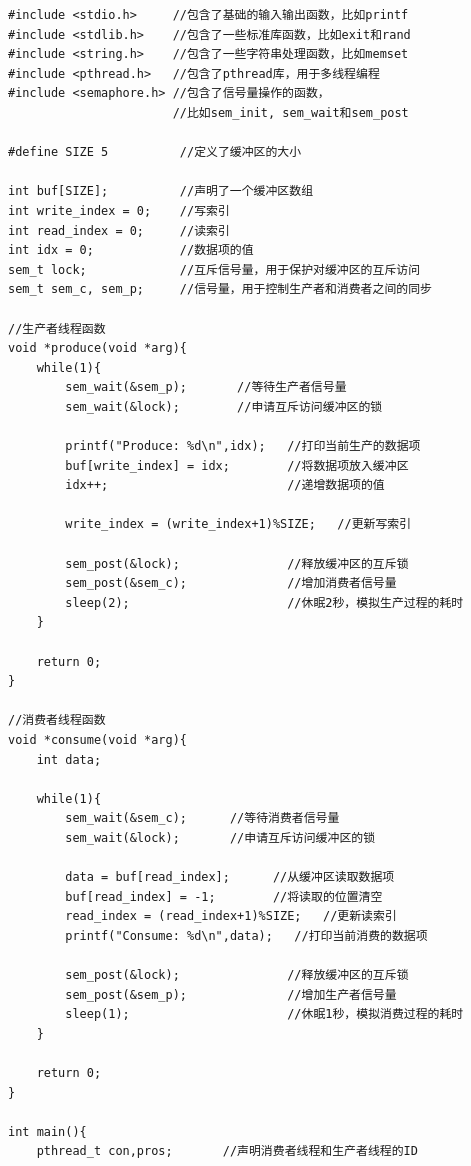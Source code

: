 \documentclass[12pt, a4paper, oneside]{ctexbook}
\numberwithin{figure}{section}
\begin{document}
\begin{verbatim}
#include <stdio.h>     //包含了基础的输入输出函数，比如printf
#include <stdlib.h>    //包含了一些标准库函数，比如exit和rand
#include <string.h>    //包含了一些字符串处理函数，比如memset
#include <pthread.h>   //包含了pthread库，用于多线程编程
#include <semaphore.h> //包含了信号量操作的函数，
                       //比如sem_init, sem_wait和sem_post

#define SIZE 5          //定义了缓冲区的大小

int buf[SIZE];          //声明了一个缓冲区数组
int write_index = 0;    //写索引
int read_index = 0;     //读索引
int idx = 0;            //数据项的值
sem_t lock;             //互斥信号量，用于保护对缓冲区的互斥访问
sem_t sem_c, sem_p;     //信号量，用于控制生产者和消费者之间的同步

//生产者线程函数
void *produce(void *arg){
    while(1){
        sem_wait(&sem_p);       //等待生产者信号量
        sem_wait(&lock);        //申请互斥访问缓冲区的锁
        
        printf("Produce: %d\n",idx);   //打印当前生产的数据项
        buf[write_index] = idx;        //将数据项放入缓冲区
        idx++;                         //递增数据项的值
        
        write_index = (write_index+1)%SIZE;   //更新写索引

        sem_post(&lock);               //释放缓冲区的互斥锁
        sem_post(&sem_c);              //增加消费者信号量       
        sleep(2);                      //休眠2秒，模拟生产过程的耗时
    }    
   
    return 0;
}

//消费者线程函数
void *consume(void *arg){
    int data;

    while(1){
        sem_wait(&sem_c);      //等待消费者信号量
        sem_wait(&lock);       //申请互斥访问缓冲区的锁
        
        data = buf[read_index];      //从缓冲区读取数据项
        buf[read_index] = -1;        //将读取的位置清空
        read_index = (read_index+1)%SIZE;   //更新读索引
        printf("Consume: %d\n",data);   //打印当前消费的数据项

        sem_post(&lock);               //释放缓冲区的互斥锁
        sem_post(&sem_p);              //增加生产者信号量       
        sleep(1);                      //休眠1秒，模拟消费过程的耗时
    }    
   
    return 0;
}

int main(){
    pthread_t con,pros;       //声明消费者线程和生产者线程的ID


\end{verbatim}
\end{document}
